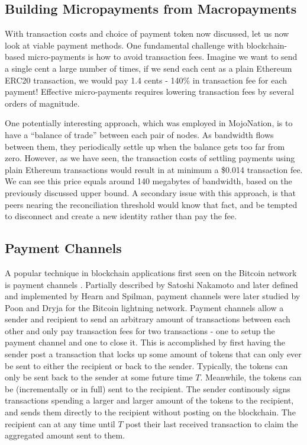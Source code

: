 \subsection{Building Micropayments from Macropayments}

With transaction costs and choice of payment token now discussed, let us now look at viable payment methods. One fundamental challenge with blockchain-based micro-payments is how to avoid transaction fees. Imagine we want to send a single cent a large number of times, if we send each cent as a plain Ethereum ERC20 transaction, we would pay 1.4 cents - 140\% in transaction fee for each payment! Effective micro-payments requires lowering transaction fees by several orders of magnitude.

One potentially interesting approach, which was employed in MojoNation\cite{mojonation}, is to have a ``balance of trade'' between each pair of nodes. As bandwidth flows between them, they periodically settle up when the balance gets too far from zero. However, as we have seen, the transaction costs of settling payments using plain Ethereum transactions would result in at minimum a \$0.014 transaction fee. We can see this price equals around 140 megabytes of bandwidth, based on the previously discussed upper bound. A secondary issue with this approach, is that peers nearing the reconciliation threshold would know that fact, and be tempted to disconnect and create a new identity rather than pay the fee.

\subsection{Payment Channels}

A popular technique in blockchain applications first seen on the Bitcoin network is payment channels \cite{PaymentChannels}. Partially described by Satoshi Nakamoto\cite{Satoshi} and later defined and implemented by Hearn and Spilman\cite{BitcoinWikiContracts}, payment channels were later studied by Poon and Dryja\cite{PoonDryja} for the Bitcoin lightning network. Payment channels allow a sender and recipient to send an arbitrary amount of transactions between each other and only pay transaction fees for two transactions - one to setup the payment channel and one to close it. This is accomplished by first having the sender post a transaction that locks up some amount of tokens that can only ever be sent to either the recipient or back to the sender. Typically, the tokens can only be sent back to the sender at some future time $T$. Meanwhile, the tokens can be (incrementally or in full) sent to the recipient. The sender continously signs transactions spending a larger and larger amount of the tokens to the recipient, and sends them directly to the recipient without posting on the blockchain. The recipient can at any time until $T$ post their last received transaction to claim the aggregated amount sent to them.

